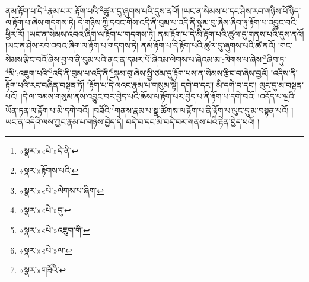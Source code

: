 ནམ་རྟོག་པ་དེ་\footnote{«སྣར་»«པེ་»དེ་ནི་}རྣམ་པར་:རྟོག་པའི་\footnote{«སྣར་»རྟོགས་པའི་}ཚུལ་དུ་ཞུགས་པའི་དུས་ནའོ། །ཡང་ན་སེམས་པ་དང་ཤེས་རབ་གཉིས་པོ་ཉིད་ལ་རྟོག་པ་ཞེས་གདགས་ཏེ། དེ་གཉིས་ཀྱི་དབང་གིས་འདི་ནི་བུམ་པ་འདི་ནི་སྣམ་བུ་ཞེས་ཞིབ་ཏུ་རྟོག་པ་འབྱུང་བའི་ཕྱིར་རོ། །ཡང་ན་སེམས་འབའ་ཞིག་ལ་རྟོག་པ་གདགས་ཏེ། ནམ་རྟོག་པ་དེ་མི་རྟོག་པའི་ཚུལ་དུ་གནས་པའི་དུས་ནའོ། །ཡང་ན་ཤེས་རབ་འབའ་ཞིག་ལ་རྟོག་པ་གདགས་ཏེ། ནམ་རྟོག་པ་དེ་རྟོག་པའི་ཚུལ་དུ་ཞུགས་པའི་ཚེ་ནའོ། །གང་སེམས་རྩིང་བའོ་ཞེས་བྱ་བ་ནི་བུམ་པའི་ནང་ན་དམར་པོ་ཞེའམ་ལེགས་པ་ཞེའམ་མ་:ལེགས་པ་ཞེས་\footnote{«སྣར་»«པེ་»ལེགས་པ་ཞིག་}ཞིབ་ཏུ་\footnote{«སྣར་»«པེ་»དུ་}མི་:འཇུག་པའི་\footnote{«སྣར་»«པེ་»འཇུག་གི་}འདི་ནི་བུམ་པ་འདི་ནི་\footnote{«སྣར་»«པེ་»ལ་}སྣམ་བུ་ཞེས་སྤྱི་ཙམ་དུ་རྟོག་པས་ན་སེམས་རྩིང་བ་ཞེས་བྱའོ། །འདིས་ནི་རྟོག་པའི་རང་བཞིན་བསྟན་ཏོ། །རྟོག་པ་དེ་ལའང་རྣམ་པ་གསུམ་སྟེ། དགེ་བ་དང་། མི་དགེ་བ་དང་། ལུང་དུ་མ་བསྟན་པའོ། །དེ་ལ་ཁམས་གསུམ་ནས་འབྱུང་བར་བྱེད་པའི་ཆོས་ལ་རྟོག་པར་བྱེད་པ་ནི་རྟོག་པ་དགེ་བའོ། །འདོད་པ་ལྔའི་ཡོན་ཏན་ལ་རྟོག་པ་མི་དགེ་བའོ། །བཟོའི་\footnote{«སྣར་»གཟོའི་}གནས་རྣམ་པ་སྣ་ཚོགས་ལ་རྟོག་པ་ནི་རྟོག་པ་ལུང་དུ་མ་བསྟན་པའོ། །ཡང་ན་འདིའི་ལས་ཀྱང་རྣམ་པ་གཉིས་བྱེད་དེ། བདེ་བ་དང་མི་བདེ་བར་གནས་པའི་རྟེན་བྱེད་པའོ། །
